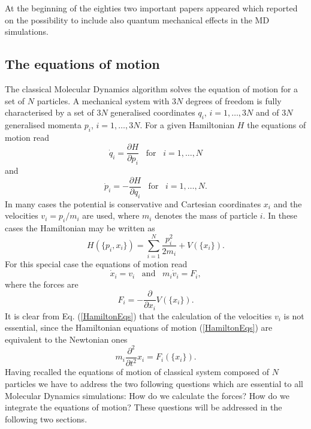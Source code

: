 At the beginning of the eighties two important papers appeared which reported
on the possibility to include also quantum mechanical effects in the MD
simulations.

\subsection{The equations of motion}
The classical Molecular Dynamics algorithm solves the equation of motion for a
set of $N$ particles. A mechanical system with $3N$ degrees of freedom is
fully characterised by a set of $3N$ generalised coordinates $q_i$, 
$i=1, \ldots, 3N$ and of $3N$ generalised momenta $p_i$, 
$i=1, \ldots, 3N$. For a given Hamiltonian $H$ the equations of motion
read
\begin{displaymath}
  \dot{q}_i = \frac{\partial H}{\partial p_i} \;\;\; \mbox{for} 
 \;\;\; i=1, \ldots, N
\end{displaymath}
and
\begin{displaymath}
  \dot{p}_i = - \frac{\partial H}{\partial q_i} 
      \;\;\; \mbox{for} \;\;\; i=1, \ldots, N.
\end{displaymath}
In many cases the potential is conservative and Cartesian coordinates
$x_i$ and the velocities $v_i = p_i/m_i$ are used, where $m_i$ denotes the
mass of particle $i$. In these cases the Hamiltonian may be written as
\begin{displaymath}
  H(\{p_i,x_i\}) = \sum_{i=1}^N \frac{p_i^2}{2m_i} + V(\{x_i\}).
\end{displaymath}
For this special case the equations of motion read
\begin{equation}
   \label{HamiltonEqs}
  \dot{x}_i = v_i \;\;\; \mbox{and} \;\;\; m_i \dot{v}_i = F_i,
\end{equation}
where the forces are
\begin{displaymath}
  F_i = - \frac{\partial}{\partial x_i} V(\{x_i\}).
\end{displaymath}
It is clear from Eq. (\ref{HamiltonEqs}) that the calculation of the
velocities $v_i$ is not essential, since the Hamiltonian equations of motion 
(\ref{HamiltonEqs}) are  equivalent to the Newtonian ones
\begin{displaymath}
  m_i \frac{\partial^2}{\partial t^2}{x}_i = F_i(\{x_i\}).
\end{displaymath}
Having recalled the equations of motion of classical system composed of $N$
particles we have to address the two following questions which are essential
to all Molecular Dynamics simulations: How do we calculate the forces? How do
we integrate the equations of motion? These questions will be addressed in the
following two sections.


